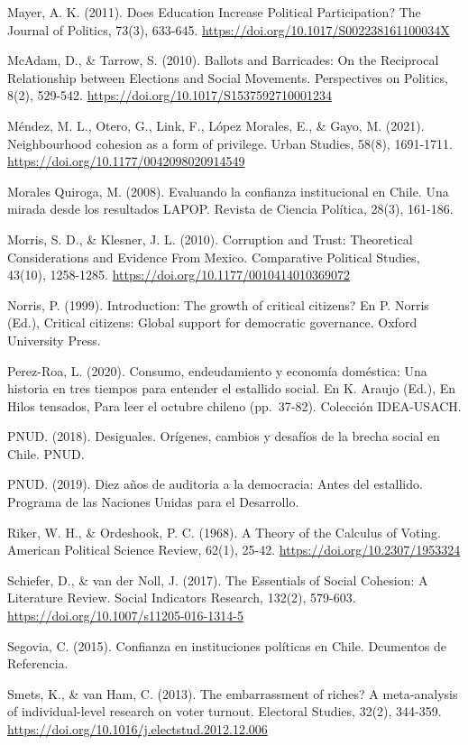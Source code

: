 \documentclass[
  12pt,
]{book}
\begin{document}
Mayer, A. K. (2011). Does Education Increase Political Participation? The Journal of Politics, 73(3), 633-645. \url{https://doi.org/10.1017/S002238161100034X}

McAdam, D., \& Tarrow, S. (2010). Ballots and Barricades: On the Reciprocal Relationship between Elections and Social Movements. Perspectives on Politics, 8(2), 529-542. \url{https://doi.org/10.1017/S1537592710001234}

Méndez, M. L., Otero, G., Link, F., López Morales, E., \& Gayo, M. (2021). Neighbourhood cohesion as a form of privilege. Urban Studies, 58(8), 1691-1711. \url{https://doi.org/10.1177/0042098020914549}

Morales Quiroga, M. (2008). Evaluando la confianza institucional en Chile. Una mirada desde los resultados LAPOP. Revista de Ciencia Política, 28(3), 161-186.

Morris, S. D., \& Klesner, J. L. (2010). Corruption and Trust: Theoretical Considerations and Evidence From Mexico. Comparative Political Studies, 43(10), 1258-1285. \url{https://doi.org/10.1177/0010414010369072}

Norris, P. (1999). Introduction: The growth of critical citizens? En P. Norris (Ed.), Critical citizens: Global support for democratic governance. Oxford University Press.

Perez-Roa, L. (2020). Consumo, endeudamiento y economía doméstica: Una historia en tres tiempos para entender el estallido social. En K. Araujo (Ed.), En Hilos tensados, Para leer el octubre chileno (pp.~37-82). Colección IDEA-USACH.

PNUD. (2018). Desiguales. Orígenes, cambios y desafíos de la brecha social en Chile. PNUD.

PNUD. (2019). Diez años de auditoria a la democracia: Antes del estallido. Programa de las Naciones Unidas para el Desarrollo.

Riker, W. H., \& Ordeshook, P. C. (1968). A Theory of the Calculus of Voting. American Political Science Review, 62(1), 25-42. \url{https://doi.org/10.2307/1953324}

Schiefer, D., \& van der Noll, J. (2017). The Essentials of Social Cohesion: A Literature Review. Social Indicators Research, 132(2), 579-603. \url{https://doi.org/10.1007/s11205-016-1314-5}

Segovia, C. (2015). Confianza en instituciones políticas en Chile. Dcumentos de Referencia.

Smets, K., \& van Ham, C. (2013). The embarrassment of riches? A meta-analysis of individual-level research on voter turnout. Electoral Studies, 32(2), 344-359. \url{https://doi.org/10.1016/j.electstud.2012.12.006}
\end{document}
